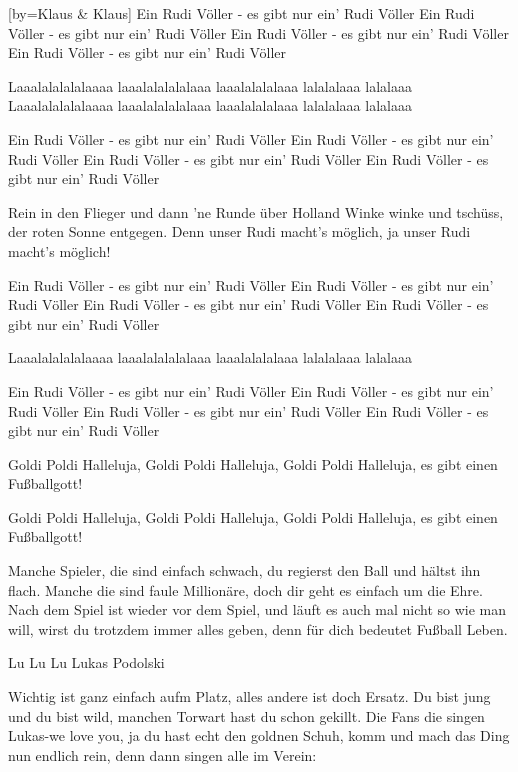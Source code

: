 [by={Klaus \& Klaus}]
\beginverse
Ein Rudi Völler - es gibt nur ein' Rudi Völler
Ein Rudi Völler - es gibt nur ein' Rudi Völler
Ein Rudi Völler - es gibt nur ein' Rudi Völler
Ein Rudi Völler - es gibt nur ein' Rudi Völler
\endverse

\beginchorus
Laaalalalalalaaaa laaalalalalalaaa 
laaalalalalaaa lalalalaaa lalalaaa
Laaalalalalalaaaa laaalalalalalaaa 
laaalalalalaaa lalalalaaa lalalaaa
\endchorus

\beginverse
Ein Rudi Völler - es gibt nur ein' Rudi Völler
Ein Rudi Völler - es gibt nur ein' Rudi Völler
Ein Rudi Völler - es gibt nur ein' Rudi Völler
Ein Rudi Völler - es gibt nur ein' Rudi Völler
\endverse

\beginverse
Rein in den Flieger 
und dann 'ne Runde über Holland
Winke winke und tschüss, 
der roten Sonne entgegen.
Denn unser Rudi macht's möglich, 
ja unser Rudi macht's möglich!
\endverse

\beginverse
Ein Rudi Völler - es gibt nur ein' Rudi Völler
Ein Rudi Völler - es gibt nur ein' Rudi Völler
Ein Rudi Völler - es gibt nur ein' Rudi Völler
Ein Rudi Völler - es gibt nur ein' Rudi Völler
\endverse

\beginchorus
Laaalalalalalaaaa laaalalalalalaaa 
laaalalalalaaa lalalalaaa lalalaaa
\endchorus

\beginverse
Ein Rudi Völler - es gibt nur ein' Rudi Völler
Ein Rudi Völler - es gibt nur ein' Rudi Völler
Ein Rudi Völler - es gibt nur ein' Rudi Völler
Ein Rudi Völler - es gibt nur ein' Rudi Völler
\endverse
\endsong

\beginverse
Goldi Poldi Halleluja,
Goldi Poldi Halleluja,
Goldi Poldi Halleluja,
es gibt einen Fußballgott!

Goldi Poldi Halleluja,
Goldi Poldi Halleluja,
Goldi Poldi Halleluja,
es gibt einen Fußballgott!
\endverse

\beginverse
Manche Spieler, die sind einfach schwach,
du regierst den Ball und hältst ihn flach.
Manche die sind faule Millionäre,
doch dir geht es einfach um die Ehre.
Nach dem Spiel ist wieder vor dem Spiel,
und läuft es auch mal nicht so wie man will,
wirst du trotzdem immer alles geben,
denn für dich bedeutet Fußball Leben.
\endverse

\beginchorus
Lu Lu Lu Lukas Podolski 
\endchorus

\beginverse
Wichtig ist ganz einfach aufm Platz,
alles andere ist doch Ersatz.
Du bist jung und du bist wild,
manchen Torwart hast du schon gekillt.
Die Fans die singen Lukas-we love you,
ja du hast echt den goldnen Schuh,
komm und mach das Ding nun endlich rein,
denn dann singen alle im Verein:
\endverse

